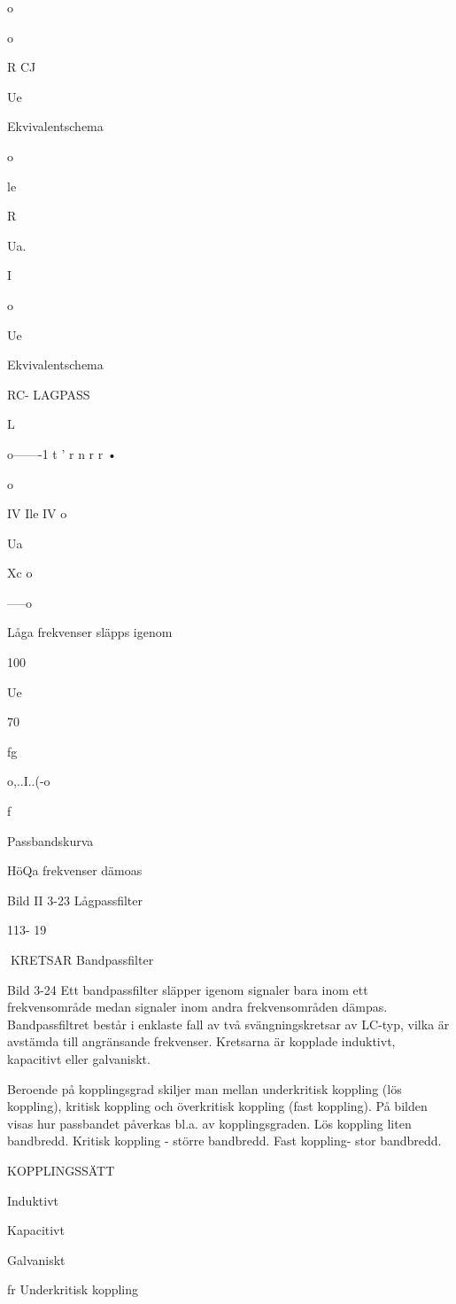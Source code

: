 {{{o

o

R
CJ

Ue

Ekvivalentschema

o

le

R

Ua.

I

o

Ue

Ekvivalentschema

RC- LAGPASS

L

o-------1 t ' r n r r •

o

IV Ile IV
o

Ua

Xc
o

-----o

Låga frekvenser släpps igenom

100

Ue

70

fg

o,..I..(-o

f

Passbandskurva

HöQa frekvenser dämoas

Bild II 3-23 Lågpassfilter

113- 19

KRETSAR
Bandpassfilter

Bild 3-24
Ett bandpassfilter släpper igenom signaler
bara inom ett frekvensområde medan signaler inom andra frekvensområden dämpas.
Bandpassfiltret består i enklaste fall av
två svängningskretsar av LC-typ, vilka är
avstämda till angränsande frekvenser. Kretsarna är kopplade induktivt, kapacitivt eller
galvaniskt.

Beroende på kopplingsgrad skiljer man
mellan underkritisk koppling (lös koppling),
kritisk koppling och överkritisk koppling (fast
koppling).
På bilden visas hur passbandet påverkas
bl.a. av kopplingsgraden. Lös koppling liten bandbredd. Kritisk koppling - större
bandbredd. Fast koppling- stor bandbredd.

KOPPLINGSSÄTT

Induktivt

Kapacitivt

Galvaniskt

fr
Underkritisk koppling

}}}
